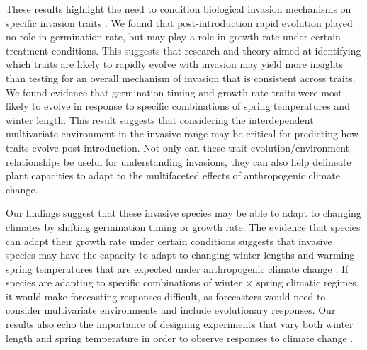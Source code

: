 \documentclass[11pt]{article}\usepackage[]{graphicx}\usepackage[]{color}
\begin{document}
	These results highlight the need to condition biological invasion mechanisms on specific invasion traits \parencite{Maillet2000}. We found that post-introduction rapid evolution played no role in germination rate, but may play a role in growth rate under certain treatment conditions. This suggests that research and theory aimed at identifying which traits are likely to rapidly evolve with invasion may yield more insights than testing for an overall mechanism of invasion that is consistent across traits. We found evidence that germination timing and growth rate traits were most likely to evolve in response to specific combinations of spring temperatures and winter length. This result suggests that considering the interdependent multivariate environment in the invasive range may be critical for predicting how traits evolve post-introduction. 
Not only can these trait evolution/environment relationships be useful for understanding invasions, they can also help delineate plant capacities to adapt to the multifaceted effects of anthropogenic climate change. 
	
	Our findings suggest that these invasive species may be able to adapt to changing climates by shifting germination timing or growth rate. The evidence that species can adapt their growth rate under certain conditions suggests that invasive species may have the capacity to adapt to changing winter lengths and warming spring temperatures that are expected under anthropogenic climate change \parencite{IPCC2015}. If species are adapting to specific combinations of winter $\times$ spring climatic regimes, it would make forecasting responses difficult, as forecasters would need to consider multivariate environments and include evolutionary responses. Our results also echo the importance of designing experiments that vary both winter length and spring temperature in order to observe responses to climate change \parencite[e.g.,][]{Bernareggi2016}. 
\end{document}
